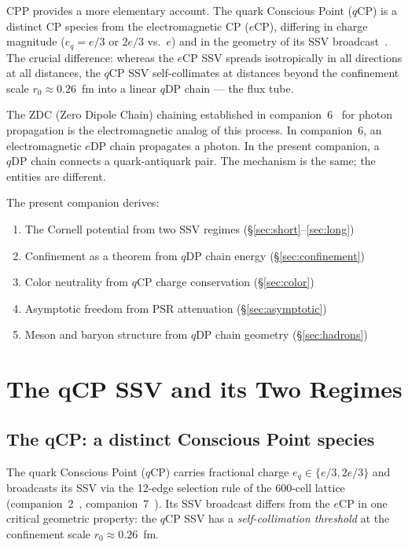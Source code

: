 \documentclass[12pt]{article}
\newcommand{\eCP}{e\mathrm{CP}}
\newcommand{\qCP}{q\mathrm{CP}}
\newcommand{\eDP}{e\mathrm{DP}}
\newcommand{\qDP}{q\mathrm{DP}}
\begin{document}
CPP provides a more elementary account. The quark Conscious Point
($\qCP$) is a distinct CP species from the electromagnetic CP ($\eCP$),
differing in charge magnitude ($e_q = e/3$ or $2e/3$ vs.\ $e$) and
in the geometry of its SSV broadcast~\cite{v16}. The crucial difference:
whereas the $\eCP$ SSV spreads isotropically in all directions at all
distances, the $\qCP$ SSV self-collimates at distances beyond the
confinement scale $r_0 \approx 0.26$~fm into a linear $\qDP$ chain
— the flux tube.

The ZDC (Zero Dipole Chain) chaining established in companion~6~\cite{c6}
for photon propagation is the electromagnetic analog of this process.
In companion~6, an electromagnetic $\eDP$ chain propagates a photon.
In the present companion, a $\qDP$ chain connects a quark-antiquark
pair. The mechanism is the same; the entities are different.

The present companion derives:
\begin{enumerate}[noitemsep]
\item The Cornell potential from two SSV regimes
  (§\ref{sec:short}--\ref{sec:long})
\item Confinement as a theorem from $\qDP$ chain energy
  (§\ref{sec:confinement})
\item Color neutrality from $\qCP$ charge conservation
  (§\ref{sec:color})
\item Asymptotic freedom from PSR attenuation
  (§\ref{sec:asymptotic})
\item Meson and baryon structure from $\qDP$ chain geometry
  (§\ref{sec:hadrons})
\end{enumerate}

\section{The qCP SSV and its Two Regimes}
\label{sec:two_regimes}

\subsection{The qCP: a distinct Conscious Point species}

The quark Conscious Point ($\qCP$) carries fractional charge
$e_q \in \{e/3, 2e/3\}$ and broadcasts its SSV via the 12-edge
selection rule of the 600-cell lattice (companion~2~\cite{c2},
companion~7~\cite{c7}). Its SSV broadcast differs from the $\eCP$
in one critical geometric property: the $\qCP$ SSV has a
\emph{self-collimation threshold} at the confinement scale
$r_0 \approx 0.26$~fm.
\end{document}
